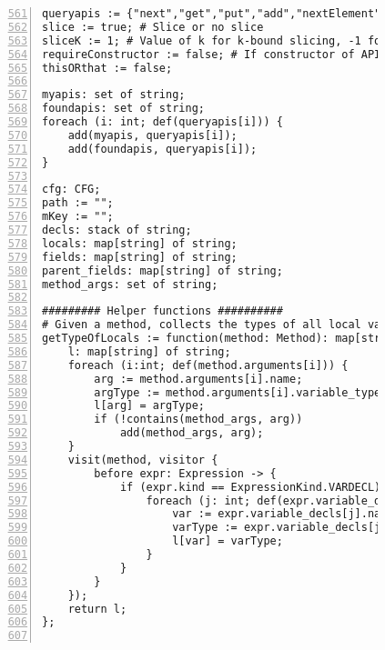 \begin{figure}[ht!]
\begin{lstlisting}[numbers=left, tabsize=4, escapechar=@, caption={API Usage Mining Analysis},label={lst:aun-code},  firstline = 561, firstnumber = 561, lastline = 621]
queryapis := {"next","get","put","add","nextElement","elementAt","size","remove","nextToken","toArray","getString","group","getProperty","iterator","addElement","info","compile","containsKey","matcher","setProperty","contains","fine","set","keySet","addAll","nextInt","log","entrySet","pop","warning","asList","getTime","push","indexOf","subList","fill","values","clear","getTimeZone","hasNext","getBundle","sort","finest","getLogger","end","start","store","removeElementAt","setTime","removeFirst","severe","finer","copyInto","getKey","peek","insertElementAt","hasMoreTokens","getValue","getName","previous","compare","getBoolean","isEmpty","copyOf","load","elements","getInputStream","getInt","schedule","removeElement","firstElement","appendReplacement","userNodeForPackage","setElementAt","putAll","unmodifiableList","replaceAll","write","split","nextLine","hasMoreElements","after","noneOf","removeLast","before","removeAll","listIterator","addLast","cancel","groupCount","putInt","equals","addFirst","toString","singleton","singletonList","node","getFirst","matches","keys","putBoolean","getLast","copyOfRange","binarySearch","compareTo","isDirectory","scheduleAtFixedRate","nextSetBit","hashCode","setTimeInMillis","config","allOf","getLanguage","poll","find","entering","first","setSize","lastElement","replaceFirst","compareAndSet","putIfAbsent"}; # API methods
slice := true; # Slice or no slice
sliceK := 1; # Value of k for k-bound slicing, -1 for infinity
requireConstructor := false; # If constructor of API class are of interest
thisORthat := false;

myapis: set of string;
foundapis: set of string;
foreach (i: int; def(queryapis[i])) {
    add(myapis, queryapis[i]);   
    add(foundapis, queryapis[i]);
}

cfg: CFG;
path := "";
mKey := "";
decls: stack of string;
locals: map[string] of string;
fields: map[string] of string;
parent_fields: map[string] of string;
method_args: set of string;

######### Helper functions ##########
# Given a method, collects the types of all local variables including method parameters
getTypeOfLocals := function(method: Method): map[string] of string {
    l: map[string] of string;
    foreach (i:int; def(method.arguments[i])) {
        arg := method.arguments[i].name;
        argType := method.arguments[i].variable_type.name;
        l[arg] = argType;
        if (!contains(method_args, arg))
            add(method_args, arg);
    }
    visit(method, visitor {
        before expr: Expression -> {            
            if (expr.kind == ExpressionKind.VARDECL) {
                foreach (j: int; def(expr.variable_decls[j])) {
                    var := expr.variable_decls[j].name;
                    varType := expr.variable_decls[j].variable_type.name;
                    l[var] = varType;
                }
            }
        }
    });
    return l;
};


\end{lstlisting}
\end{figure}
